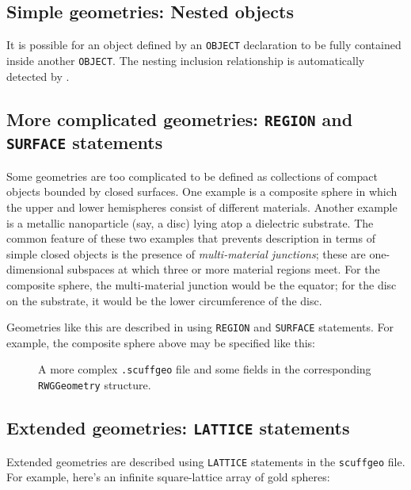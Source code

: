 \subsection*{Simple geometries: Nested objects} 

It is possible for an object defined by an
\texttt{OBJECT} declaration to be fully 
contained inside another \texttt{OBJECT}. 
The nesting inclusion relationship is automatically 
detected by \ls. 

\subsection*{More complicated geometries: \texttt{REGION}
             and \texttt{SURFACE} statements}

Some geometries are too complicated to be defined 
as collections of compact objects bounded by closed 
surfaces. One example is a composite sphere in which 
the upper and lower hemispheres consist of different 
materials. Another example is a metallic nanoparticle 
(say, a disc) lying atop a dielectric substrate. The 
common feature of these two examples that prevents 
description in terms of simple closed objects is the 
presence of \textit{multi-material junctions}; these
are one-dimensional subspaces at which three
or more material regions meet. 
For the composite sphere, the multi-material junction 
would be the equator; for the disc on the substrate, 
it would be the lower circumference of the disc.

Geometries like this are described in \lss
using \texttt{REGION} and \texttt{SURFACE}
statements. For example, the composite sphere
above may be specified like this:
\begin{figure}[H]
\begin{center}
\caption{A more complex \texttt{.scuffgeo} file and some fields in the 
         corresponding \texttt{RWGGeometry} structure.}
\end{center}
\end{figure}
\subsection*{Extended geometries: \texttt{LATTICE}
             statements}

Extended geometries are described using \texttt{LATTICE}
statements in the \texttt{scuffgeo} file.
For example, here's an infinite square-lattice array 
of gold spheres:

